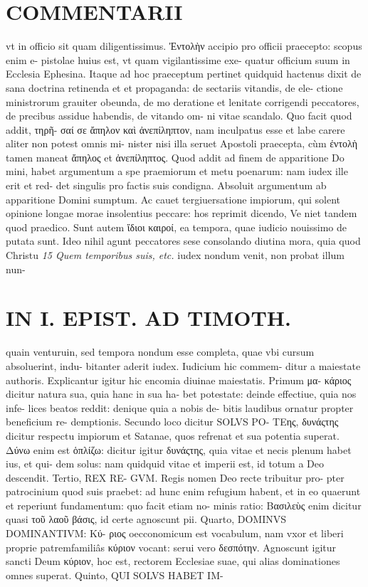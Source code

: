 \documentclass{article}
\begin{document}
\begin{pages}
\section*{COMMENTARII }
\marginpar{[ p.164 ]}\pstart vt in officio sit quam diligentissimus. Ἐντολὴν accipio pro officii praecepto: scopus enim e- pistolae huius est, vt quam vigilantissime exe- quatur officium suum in Ecclesia Ephesina. Itaque ad hoc praeceptum pertinet quidquid hactenus dixit de sana doctrina retinenda et et propaganda: de sectariis vitandis, de ele- ctione ministrorum grauiter obeunda, de mo deratione et lenitate corrigendi peccatores, de precibus assidue habendis, de vitando om- ni vitae scandalo. Quo facit quod addit, τηρῆ- σαί σε ἄπηλον καὶ ἀνεπίληπτον, nam inculpatus esse et labe carere aliter non potest omnis mi- nister nisi illa seruet Apostoli praecepta, cùm ἐντολὴ tamen maneat ἄπηλος et ἀνεπίληπτος. Quod addit ad finem de apparitione Do mini, habet argumentum a spe praemiorum et metu poenarum: nam iudex ille erit et red- det singulis pro factis suis condigna. Absoluit argumentum ab apparitione Domini sumptum. Ac cauet tergiuersatione impiorum, qui solent opinione longae morae insolentius peccare: hos reprimit dicendo, Ve niet tandem quod praedico. Sunt autem ἵδιοι καιροί, ea tempora, quae iudicio nouissimo de putata sunt. Ideo nihil agunt peccatores sese consolando diutina mora, quia quod Christu  \pend
\textit{15 Quem temporibus suis, etc. }\pstart iudex nondum venit, non probat illum nun-  \pend
\section*{IN I. EPIST. AD TIMOTH. }
\marginpar{[ p.165 ]}\pstart quain venturuin, sed tempora nondum esse completa, quae vbi cursum absoluerint, indu- bitanter aderit iudex. Iudicium hic commem- ditur a maiestate authoris. Explicantur igitur hic encomia diuinae maiestatis. Primum μα- κάριος dicitur natura sua, quia hanc in sua ha- bet potestate: deinde effectiue, quia nos infe- lices beatos reddit: denique quia a nobis de- bitis laudibus ornatur propter beneficium re- demptionis. Secundo loco dicitur SOLVS PO- ΤEης, δυνάςτης dicitur respectu impiorum et Satanae, quos refrenat et sua potentia superat. Δύνω enim est ὁπλίζω: dicitur igitur δυνάςτης, quia vitae et necis plenum habet ius, et qui- dem solus: nam quidquid vitae et imperii est, id totum a Deo descendit. Tertio, REX RE- GVM. Regis nomen Deo recte tribuitur pro- pter patrocinium quod suis praebet: ad hunc enim refugium habent, et in eo quaerunt et reperiunt fundamentum: quo facit etiam no- minis ratio: Βασιλεὺς enim dicitur quasi τοῦ λαοῦ βάσις, id certe agnoscunt pii.  \pend\pstart Quarto, DOMINVS DOMINANTIVM: Κύ- ριος oecconomicum est vocabulum, nam vxor et liberi proprie patremfamiliâs κύριον vocant: serui vero δεσπότην. Agnoscunt igitur sancti Deum κύριον, hoc est, rectorem Ecclesiae suae, qui alias dominationes omnes superat.  \pend\pstart Quinto, QUI SOLVS HABET IM-  \pend

\end{pages}
\end{document}
